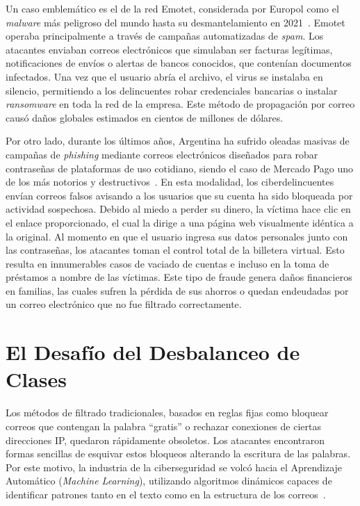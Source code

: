 \documentclass[a4paper,11pt ,openany]{book}
\begin{document}
Un caso emblemático es el de la red Emotet, considerada por Europol como el \textit{malware} más peligroso del mundo hasta su desmantelamiento en 2021~\cite{europol2021emotet}. Emotet operaba principalmente a través de campañas automatizadas de \textit{spam}. Los atacantes enviaban correos electrónicos que simulaban ser facturas legítimas, notificaciones de envíos o alertas de bancos conocidos, que contenían documentos infectados. Una vez que el usuario abría el archivo, el virus se instalaba en silencio, permitiendo a los delincuentes robar credenciales bancarias o instalar \textit{ransomware} en toda la red de la empresa. Este método de propagación por correo causó daños globales estimados en cientos de millones de dólares.

Por otro lado, durante los últimos años, Argentina ha sufrido oleadas masivas de campañas de \textit{phishing} mediante correos electrónicos diseñados para robar contraseñas de plataformas de uso cotidiano, siendo el caso de Mercado Pago uno de los más notorios y destructivos~\cite{eset2023mercadopago}. 
En esta modalidad, los ciberdelincuentes envían correos falsos avisando a los usuarios que su cuenta ha sido bloqueada por actividad sospechosa. Debido al miedo a perder su dinero, la víctima hace clic en el enlace proporcionado, el cual la dirige a una página web visualmente idéntica a la original. Al momento en que el usuario ingresa sus datos personales junto con las contraseñas, los atacantes toman el control total de la billetera virtual. Esto resulta en innumerables casos de vaciado de cuentas e incluso en la toma de préstamos a nombre de las víctimas. Este tipo de fraude genera daños financieros en familias, las cuales sufren la pérdida de sus ahorros o quedan endeudadas por un correo electrónico que no fue filtrado correctamente.

\section{El Desafío del Desbalanceo de Clases}
Los métodos de filtrado tradicionales, basados en reglas fijas como bloquear correos que contengan la palabra ``gratis''  o rechazar conexiones de ciertas direcciones IP, quedaron rápidamente obsoletos. Los atacantes encontraron formas sencillas de esquivar estos bloqueos alterando la escritura de las palabras. Por este motivo, la industria de la ciberseguridad se volcó hacia el Aprendizaje Automático (\textit{Machine Learning}), utilizando algoritmos dinámicos capaces de identificar patrones  tanto en el texto como en la estructura de los correos~\cite{dada2019machine}.
\end{document}
